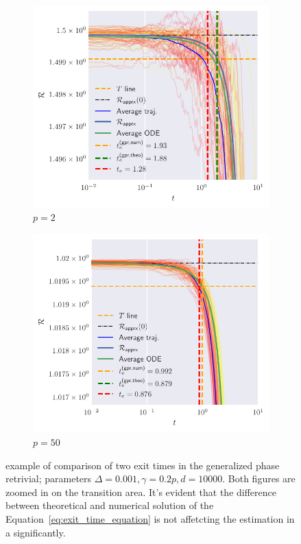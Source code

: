 \begin{figure}
  \centering
  \begin{subfigure}{0.75\textwidth}
    \includegraphics[width=1.\textwidth]{figures/spherical/gpr-p2.pdf}
    \caption{\(p=2\)}
  \end{subfigure}
  \begin{subfigure}{0.75\textwidth}
    \includegraphics[width=1.\textwidth]{figures/spherical/gpr-p50.pdf}
    \caption{\(p=50\)}
  \end{subfigure}

  \caption{
    example of comparison of two exit times in the generalized phase retrivial; parameters \(\Delta=\num{0.001}, \gamma=0.2p, d=\num{10000}\).
    Both figures are zoomed in on the transition area.
    It's evident that the difference between theoretical and numerical solution of the Equation~\eqref{eq:exit_time_equation}
    is not affetcting the estimation in a significantly.
  }
  \label{fig:spherical-generalized-phase-retrivial}
\end{figure}




